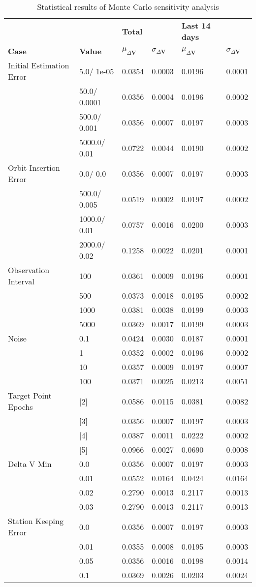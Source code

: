 \begin{table}[h!]
\centering
\begin{tabular}{llllll}
 &  & \cellcolor[HTML]{EFEFEF}\textbf{Total} &  & \cellcolor[HTML]{EFEFEF}\textbf{Last 14 days} &  \\
\rowcolor[HTML]{EFEFEF} 
\textbf{Case} & \textbf{Value} & \textbf{$\mu_{\Delta \boldsymbol{V}}$} & \textbf{$\sigma_{\Delta \boldsymbol{V}}$} & \textbf{$\mu_{\Delta \boldsymbol{V}}$} & \textbf{$\sigma_{\Delta \boldsymbol{V}}$} \\ 
Initial Estimation Error & 5.0/
1e-05 & 0.0354 & 0.0003 & 0.0196 & 0.0001 \\ 
 & 50.0/
0.0001 & 0.0356 & 0.0004 & 0.0196 & 0.0002 \\ 
 & 500.0/
0.001 & 0.0356 & 0.0007 & 0.0197 & 0.0003 \\ 
 & 5000.0/
0.01 & 0.0722 & 0.0044 & 0.0190 & 0.0002 \\ 
Orbit Insertion Error & 0.0/
0.0 & 0.0356 & 0.0007 & 0.0197 & 0.0003 \\ 
 & 500.0/
0.005 & 0.0519 & 0.0002 & 0.0197 & 0.0002 \\ 
 & 1000.0/
0.01 & 0.0757 & 0.0016 & 0.0200 & 0.0003 \\ 
 & 2000.0/
0.02 & 0.1258 & 0.0022 & 0.0201 & 0.0001 \\ 
Observation Interval & 100 & 0.0361 & 0.0009 & 0.0196 & 0.0001 \\ 
 & 500 & 0.0373 & 0.0018 & 0.0195 & 0.0002 \\ 
 & 1000 & 0.0381 & 0.0038 & 0.0199 & 0.0003 \\ 
 & 5000 & 0.0369 & 0.0017 & 0.0199 & 0.0003 \\ 
Noise & 0.1 & 0.0424 & 0.0030 & 0.0187 & 0.0001 \\ 
 & 1 & 0.0352 & 0.0002 & 0.0196 & 0.0002 \\ 
 & 10 & 0.0357 & 0.0009 & 0.0197 & 0.0007 \\ 
 & 100 & 0.0371 & 0.0025 & 0.0213 & 0.0051 \\ 
Target Point Epochs & [2] & 0.0586 & 0.0115 & 0.0381 & 0.0082 \\ 
 & [3] & 0.0356 & 0.0007 & 0.0197 & 0.0003 \\ 
 & [4] & 0.0387 & 0.0011 & 0.0222 & 0.0002 \\ 
 & [5] & 0.0966 & 0.0027 & 0.0690 & 0.0008 \\ 
Delta V Min & 0.0 & 0.0356 & 0.0007 & 0.0197 & 0.0003 \\ 
 & 0.01 & 0.0552 & 0.0164 & 0.0424 & 0.0164 \\ 
 & 0.02 & 0.2790 & 0.0013 & 0.2117 & 0.0013 \\ 
 & 0.03 & 0.2790 & 0.0013 & 0.2117 & 0.0013 \\ 
Station Keeping Error & 0.0 & 0.0356 & 0.0007 & 0.0197 & 0.0003 \\ 
 & 0.01 & 0.0355 & 0.0008 & 0.0195 & 0.0003 \\ 
 & 0.05 & 0.0356 & 0.0016 & 0.0198 & 0.0014 \\ 
 & 0.1 & 0.0369 & 0.0026 & 0.0203 & 0.0024 \\ 
\end{tabular}
\caption{Statistical results of Monte Carlo sensitivity analysis}
\label{tab:SensitivityAnalysis}
\end{table}